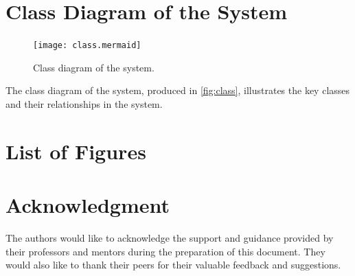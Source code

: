 \documentclass[twoside,a4paper,journal]{IEEEtran}
\begin{document}
\appendices
\section{Class Diagram of the System}
\begin{figure}[!t]
\centering
\texttt{[image: class.mermaid]}
\caption{Class diagram of the system.}
\label{fig:class}
\end{figure}
The class diagram of the system, produced in \autoref{fig:class}, illustrates
the key classes and their relationships in the system.

\section{List of Figures}
\renewcommand{\listfigurename}{}
\listoffigures



\section*{Acknowledgment}
The authors would like to acknowledge the support and guidance provided by
their professors and mentors during the preparation of this document.
They would also like to thank their peers for their valuable feedback and
suggestions.

\ifCLASSOPTIONcaptionsoff
  \newpage
\fi





%
%
%
%
%
\end{document}

